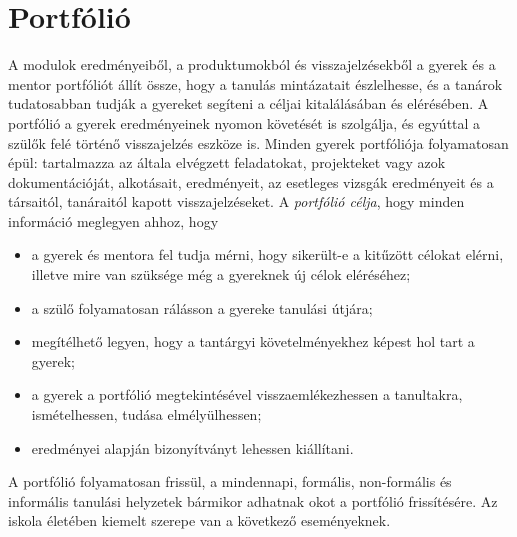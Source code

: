 \section{Portfólió}
\label{sec:portfolio}
A modulok eredményeiből, a produktumokból és visszajelzésekből a gyerek és a mentor portfóliót állít össze, hogy a tanulás mintázatait észlelhesse, és a tanárok tudatosabban tudják a gyereket segíteni a céljai kitalálásában és elérésében. A portfólió a gyerek eredményeinek nyomon követését is szolgálja, és egyúttal a szülők felé történő visszajelzés eszköze is. Minden gyerek portfóliója folyamatosan épül: tartalmazza az általa elvégzett feladatokat, projekteket vagy azok dokumentációját, alkotásait, eredményeit, az esetleges vizsgák eredményeit és a társaitól, tanáraitól kapott visszajelzéseket. A \emph{portfólió célja}, hogy minden információ meglegyen ahhoz, hogy

\begin{itemize}
      \item a gyerek és mentora fel tudja mérni, hogy sikerült-e a kitűzött célokat elérni, illetve mire van szüksége még a gyereknek új célok eléréséhez;

      \item a szülő folyamatosan rálásson a gyereke tanulási útjára;

      \item megítélhető legyen, hogy a tantárgyi követelményekhez képest hol tart a gyerek;

      \item a gyerek a portfólió megtekintésével visszaemlékezhessen a tanultakra, ismételhessen, tudása elmélyülhessen;

      \item eredményei alapján bizonyítványt lehessen kiállítani.

\end{itemize}

A portfólió folyamatosan frissül, a mindennapi, formális, non-formális és informális tanulási helyzetek bármikor adhatnak okot a portfólió frissítésére. Az iskola életében kiemelt szerepe van a következő eseményeknek.

